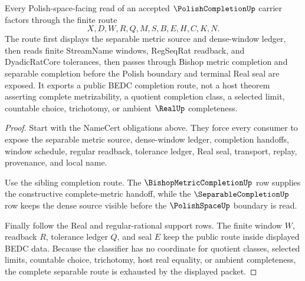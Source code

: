 \begin{theorem}
\label{thm:polish-completion-complete-separable-route}
Every Polish-space-facing read of an accepted $\PolishCompletionUp$ carrier factors through the finite route
$$
X,D,W,R,Q,M,S,B,E,H,C,K,N .
$$
The route first displays the separable metric source and dense-window ledger, then reads finite StreamName windows, RegSeqRat readback, and DyadicRatCore tolerances, then passes through Bishop metric completion and separable completion before the Polish boundary and terminal Real seal are exposed. It exports a public BEDC completion route, not a host theorem asserting complete metrizability, a quotient completion class, a selected limit, countable choice, trichotomy, or ambient $\RealUp$ completeness.
\end{theorem}
\begin{proof}
Start with the NameCert obligations above. They force every consumer to expose the separable metric source, dense-window ledger, completion handoffs, window schedule, regular readback, tolerance ledger, Real seal, transport, replay, provenance, and local name.

Use the sibling completion route. The $\BishopMetricCompletionUp$ row supplies the constructive complete-metric handoff, while the $\SeparableCompletionUp$ row keeps the dense source visible before the $\PolishSpaceUp$ boundary is read.

Finally follow the Real and regular-rational support rows. The finite window $W$, readback $R$, tolerance ledger $Q$, and seal $E$ keep the public route inside displayed BEDC data. Because the classifier has no coordinate for quotient classes, selected limits, countable choice, trichotomy, host real equality, or ambient completeness, the complete separable route is exhausted by the displayed packet.
\end{proof}


